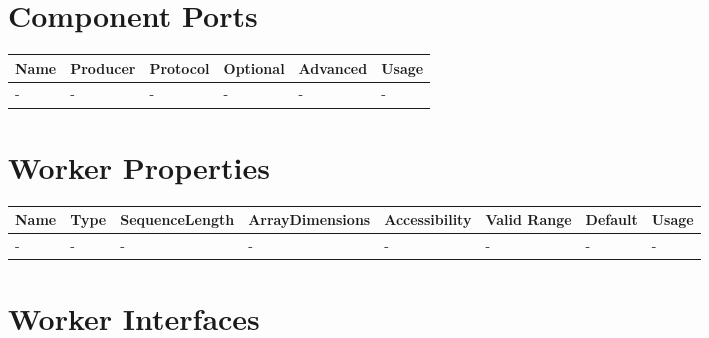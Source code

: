 \documentclass{article}
\begin{document}
\begin{landscape}
  \section*{Component Ports}
  \begin{scriptsize}
    \begin{tabular}{|p{2cm}|p{1.5cm}|p{4cm}|p{1.5cm}|p{1.5cm}|p{10.85cm}|}
      \hline
      \rowcolor{blue}
      Name & Producer & Protocol           & Optional & Advanced & Usage                  \\
      \hline
      -    & -        & -                  & -        & -        & - \\
      \hline
    \end{tabular}
  \end{scriptsize}

  \section*{Worker Properties}
  \begin{scriptsize}
    \begin{tabular}{|p{3.75cm}|p{1.25cm}|p{2cm}|p{2.75cm}|p{1.5cm}|p{1.5cm}|p{1cm}|p{6.74cm}|}
      \hline
      \rowcolor{blue}
      Name               & Type & SequenceLength & ArrayDimensions & Accessibility      & Valid Range & Default & Usage                                                                               \\
      \hline
      - & - & - & - & - & - & - & - \\
      \hline
    \end{tabular}
  \end{scriptsize}

  \section*{Worker Interfaces}

\end{landscape}
\end{document}

